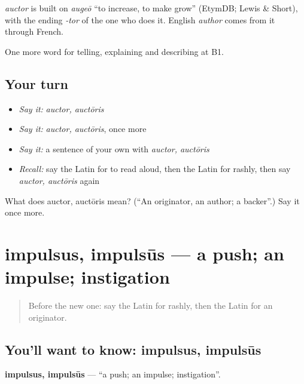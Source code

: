 \begin{cousinweb}
\emph{auctor} is built on \emph{augeō} \textquotedblleft{}to increase, to make grow\textquotedblright{} (EtymDB; Lewis \& Short), with the ending \emph{-tor} of the one who does it. English \emph{author} comes from it through French.
\end{cousinweb}

\begin{grammarlens}[title={What you've built}]
One more word for telling, explaining and describing at B1.
\end{grammarlens}

\subsection*{Your turn}
\begin{itemize}
\raggedright
  \item \emph{Say it:} \emph{auctor, auctōris}
  \item \emph{Say it:} \emph{auctor, auctōris}, once more
  \item \emph{Say it:} a sentence of your own with \emph{auctor, auctōris}
  \item \emph{Recall:} say the Latin for to read aloud, then the Latin for rashly, then say \emph{auctor, auctōris} again
\end{itemize}

\begin{tcolorbox}[breakable,colback=teal!4,colframe=teal!35!black,title={Before you move on}]
What does auctor, auctōris mean? (\textquotedblleft{}An originator, an author; a backer\textquotedblright{}.) Say it once more.
\end{tcolorbox}
\section[impulsus, impulsūs]{impulsus, impulsūs — a push; an impulse; instigation}

\label{lesson:LA-C372-impulsus}



\begin{quote}
Before the new one: say the Latin for rashly, then the Latin for an originator.
\end{quote}

\subsection*{You'll want to know: impulsus, impulsūs}
\textbf{impulsus, impulsūs} — \textquotedblleft{}a push; an impulse; instigation\textquotedblright{}.

